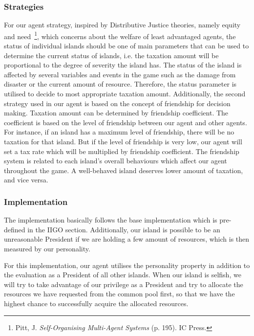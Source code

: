\subsubsection{Strategies} \label{subsubsec:Team6_President:Strategies}
For our agent strategy, inspired by Distributive Justice theories, namely equity and need~\footnote{Pitt, J. \textit{Self-Organising Multi-Agent Systems} (p. 195). IC Press.}, which concerns about the welfare of least advantaged agents, the status of individual islands should be one of main parameters that can be used to determine the current status of islands, i.e. the taxation amount will be proportional to the degree of severity the island has. The status of the island is affected by several variables and events in the game such as the damage from disaster or the current amount of resource. Therefore, the status parameter is utilised to decide to most appropriate taxation amount. Additionally, the second strategy used in our agent is based on the concept of friendship for decision making. Taxation amount can be determined by friendship coefficient. The coefficient is based on the level of friendship between our agent and other agents. For instance, if an island has a maximum level of friendship, there will be no taxation for that island. But if the level of friendship is very low, our agent will set a tax rate which will be multiplied by friendship coefficient. The friendship system is related to each island’s overall behaviours which affect our agent throughout the game. A well-behaved island deserves lower amount of taxation, and vice versa. 

\subsubsection{Implementation} \label{subsubsec:Team6_President:Implementation}
The implementation basically follows the base implementation which is pre-defined in the IIGO section. Additionally, our island is possible to be an unreasonable President if we are holding a few amount of resources, which is then measured by our personality.

For this implementation, our agent utilises the personality property in addition to the evaluation as a President of all other islands. When our island is selfish, we will try to take advantage of our privilege as a President and try to allocate the resources we have requested from the common pool first, so that we have the highest chance to successfully acquire the allocated resources.


